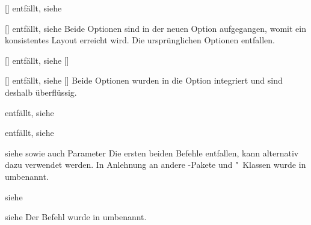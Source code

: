\begin{Declaration}{[\PBoolean]}{%
  entfällt, siehe %
}
\begin{Declaration}{[\PBoolean]}{%
  entfällt, siehe %
}
\printdeclarationlist*%
%
Beide Optionen sind in der neuen Option  
aufgegangen, womit ein konsistentes Layout erreicht wird. Die ursprünglichen 
Optionen entfallen. 
\end{Declaration}
\end{Declaration}

\begin{Declaration}{[\PBoolean]}{%
  entfällt, siehe [\PSet]%
}
\begin{Declaration}{[\PBoolean]}{%
  entfällt, siehe [\PSet]%
}
\printdeclarationlist*%
%
Beide Optionen wurden in die Option  integriert und sind 
deshalb überflüssig.
\end{Declaration}
\end{Declaration}

\begin{Declaration}{}{%
  entfällt, siehe %
}
\begin{Declaration}{}{%
  entfällt, siehe %
}
\begin{Declaration}{}{%
  siehe  sowie auch Parameter %
}
\printdeclarationlist*%
%
Die ersten beiden Befehle entfallen,  kann alternativ dazu 
verwendet werden. In Anlehnung an andere -Pakete und "~Klassen 
wurde  in  umbenannt.
\end{Declaration}
\end{Declaration}
\end{Declaration}

\begin{Declaration}{}%
  {siehe %
}
\begin{Declaration}{}%
  {siehe %
}
\printdeclarationlist*%
%
Der Befehl  wurde in  umbenannt.
\end{Declaration}
\end{Declaration}

